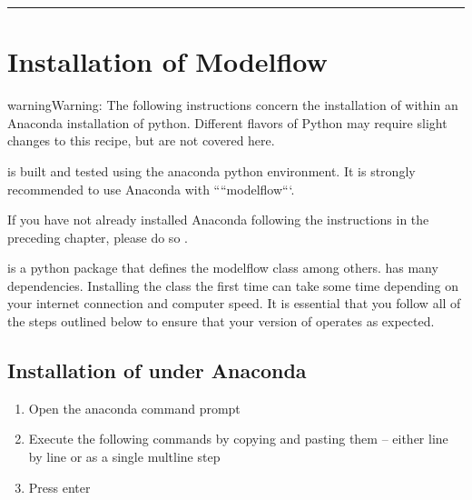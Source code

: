 \documentclass[letterpaper,10pt,english]{jupyterBook}
\begin{document}
\bigskip\hrule\bigskip


\sphinxstepscope


\chapter{Installation of Modelflow}
\label{\detokenize{content/03_Installation/InstallingModelFlow:installation-of-modelflow}}\label{\detokenize{content/03_Installation/InstallingModelFlow::doc}}
\begin{sphinxadmonition}{warning}{Warning:}
\sphinxAtStartPar
The following instructions concern the installation of  within an Anaconda installation of python.  Different flavors of Python may require slight changes to this recipe, but are not covered here.

\sphinxAtStartPar
{} is built and tested using the anaconda python environment.  It is strongly recommended to use Anaconda with ````modelflow```.

\sphinxAtStartPar
If you have not already installed Anaconda following the instructions in the preceding chapter, please do so .
\end{sphinxadmonition}

\sphinxAtStartPar
{} is a python package that defines the modelflow class  among others.   has many dependencies. Installing the class the first time can take some time depending on your internet connection and computer speed.  It is essential that you follow all of the steps outlined below to ensure that your version of  operates as expected.


\section{Installation of  under Anaconda}
\label{\detokenize{content/03_Installation/InstallingModelFlow:installation-of-modelflow-under-anaconda}}\begin{enumerate}
%
\item {} 
\sphinxAtStartPar
Open the anaconda command prompt

\item {} 
\sphinxAtStartPar
Execute the following commands by copying and pasting them – either line by line or as a single mult\sphinxhyphen{}line step

\item {} 
\sphinxAtStartPar
Press enter

\end{enumerate}
\end{document}
